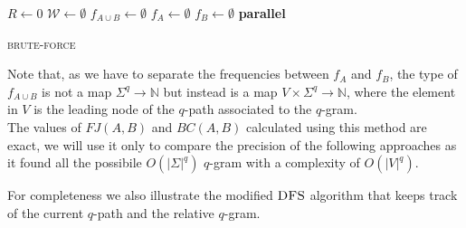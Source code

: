     \begin{algorithm}[h]
    \small
    \DontPrintSemicolon
    \BlankLine
    $R \gets 0$\;
	$\mathcal{W} \gets \emptyset$\;
	$f_{A \cup B} \gets \emptyset$ \quad \;    
	$f_{A} \gets \emptyset$\; 
	$f_{B} \gets \emptyset$\; 
	\BlankLine
    \textbf{parallel} 
	\BlankLine    
	\BlankLine
    \caption{\textsc{brute-force}}
    \label{alg:brute-force}
    \end{algorithm}

	Note that, as we have to separate the frequencies between $f_{A}$ and $f_{B}$, the type of $f_{A \cup B}$ is not a map $ \Sigma^{q} \rightarrow \mathbb{N}$
	but instead is a map $V \times \Sigma^{q} \rightarrow \mathbb{N}$, where the element in $V$ is the leading node of the $q$-path associated to the $q$-gram.\\ 
	
	The values of $FJ(A,B)$ and $BC(A,B)$ calculated using this method are exact, we will use it only to compare the precision of the following approaches as it found all the possibile $O(|\Sigma|^{q})$ $q$-gram with a complexity of $O(|V|^{q})$.\\
	
	\clearpage
	
	For completeness we also illustrate the modified $\textsc{DFS}$ algorithm that keeps track of the current $q$-path and the relative $q$-gram.
	
